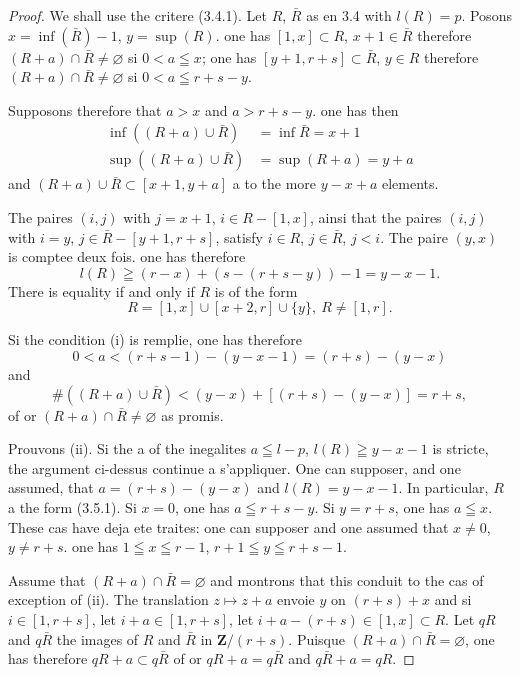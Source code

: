 \documentclass[12pt,a4paper]{article}
\theoremstyle{plain}
\theoremstyle{definition}
\begin{document}
\begin{proof}[Proof]
We shall use the critere (3.4.1). Let $R$, $\bar{R}$ as en 3.4 with $l(R) = p$. Posons $x = \inf(\bar{R}) - 1$, $y = \sup(R)$. one has $[1, x] \subset R$, $x+1 \in \bar{R}$ therefore $(R+a) \cap \bar{R} \neq \varnothing$ si $0 < a \leqq x$; one has $[y+1, r+s] \subset \bar{R}$, $y \in R$ therefore $(R+a) \cap \bar{R} \neq \varnothing$ si $0 < a \leqq r+s-y$.

Supposons therefore that $a > x$ and $a > r+s-y$. one has then
\begin{align*}
\inf((R+a) \cup \bar{R}) &= \inf \bar{R} = x+1 \\
\sup((R+a) \cup \bar{R}) &= \sup(R+a) = y+a
\end{align*}
and $(R+a) \cup \bar{R} \subset [x+1, y+a]$ a to the more $y-x+a$ elements.

The paires $(i, j)$ with $j = x+1$, $i \in R - [1, x]$, ainsi that the paires $(i, j)$ with $i = y$, $j \in \bar{R} - [y+1, r+s]$, satisfy $i \in R$, $j \in \bar{R}$, $j < i$. The paire $(y, x)$ is comptee deux fois. one has therefore
\[
l(R) \geqq (r-x) + (s-(r+s-y)) - 1 = y - x - 1.
\]
There is equality if and only if $R$ is of the form
\begin{equation}\label{eq:3.5.1}
R = [1, x] \cup [x+2, r] \cup \{y\},\ R \neq [1, r].
\tag{3.5.1}
\end{equation}

Si the condition (i) is remplie, one has therefore
\[
0 < a < (r+s-1) - (y-x-1) = (r+s) - (y-x)
\]
and
\[
\#((R+a) \cup \bar{R}) < (y-x) + [(r+s) - (y-x)] = r+s,
\]
of or $(R+a) \cap \bar{R} \neq \varnothing$ as promis.

Prouvons (ii). Si the a of the inegalites $a \leqq l-p$, $l(R) \geqq y-x-1$ is stricte, the argument ci-dessus continue a s'appliquer. One can supposer, and one assumed, that $a = (r+s) - (y-x)$ and $l(R) = y-x-1$. In particular, $R$ a the form (3.5.1). Si $x = 0$, one has $a \leqq r+s-y$. Si $y = r+s$, one has $a \leqq x$. These cas have deja ete traites: one can supposer and one assumed that $x \neq 0$, $y \neq r+s$. one has $1 \leqq x \leqq r-1$, $r+1 \leqq y \leqq r+s-1$.

Assume that $(R+a) \cap \bar{R} = \varnothing$ and montrons that this conduit to the cas of exception of (ii). The translation $z \mapsto z+a$ envoie $y$ on $(r+s)+x$ and si $i \in [1, r+s]$, let $i+a \in [1, r+s]$, let $i+a-(r+s) \in [1, x] \subset R$. Let $qR$ and $q\bar{R}$ the images of $R$ and $\bar{R}$ in $\mathbf{Z}/(r+s)$. Puisque $(R+a) \cap \bar{R} = \varnothing$, one has therefore $qR + a \subset q\bar{R}$ of or $qR + a = q\bar{R}$ and $q\bar{R} + a = qR$.


\end{proof}
\end{document}
